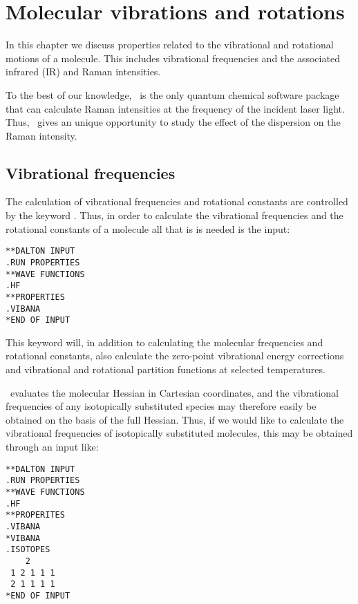 \chapter{Molecular vibrations and rotations}\label{ch:vibrot}

In this chapter we discuss properties related  to the
vibrational and rotational motions of a molecule. This includes
vibrational frequencies and the associated infrared (IR) and Raman  intensities.

To the best of our knowledge, \siraba\ is the only quantum chemical software package that can calculate
 Raman intensities at the frequency of the incident laser light. Thus,
\siraba\ gives an unique opportunity to study the effect of the
dispersion on the Raman intensity.

\section{Vibrational frequencies}\label{sec:vibfreq}

The calculation of vibrational frequencies and rotational constants are
controlled by the keyword . Thus, in order to
calculate the vibrational frequencies and the rotational constants
of a molecule all that is is needed is the input:

\begin{verbatim}
**DALTON INPUT
.RUN PROPERTIES
**WAVE FUNCTIONS
.HF
**PROPERTIES
.VIBANA
*END OF INPUT
\end{verbatim}

This keyword will, in addition to calculating the molecular frequencies
and rotational constants, also calculate the zero-point vibrational
energy corrections and vibrational
and rotational partition functions
at selected temperatures.

\siraba\ evaluates the molecular Hessian in Cartesian
coordinates, and
the vibrational frequencies of any isotopically substituted  species
may therefore easily be obtained on the basis of the full
Hessian. Thus, if we would like to calculate the vibrational
frequencies of isotopically substituted molecules, this may be obtained through an input like:

\begin{verbatim}
**DALTON INPUT
.RUN PROPERTIES
**WAVE FUNCTIONS
.HF
**PROPERITES
.VIBANA
*VIBANA
.ISOTOPES
    2
 1 2 1 1 1
 2 1 1 1 1
*END OF INPUT
\end{verbatim}

